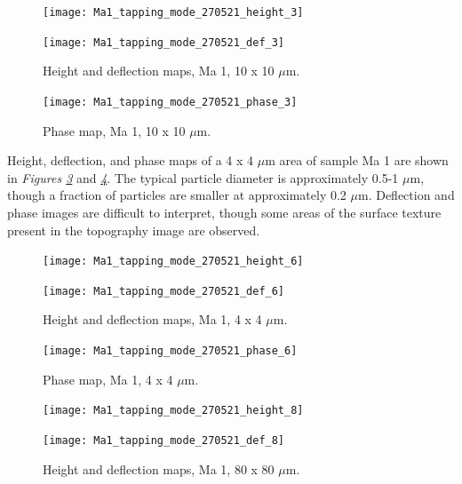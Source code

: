 \begin{figure}[H]
\centering
\begin{minipage}{.45\textwidth}
  \centering
  \texttt{[image: Ma1\_tapping\_mode\_270521\_height\_3]}
\end{minipage}
\begin{minipage}{.45\textwidth}
  \centering
  \texttt{[image: Ma1\_tapping\_mode\_270521\_def\_3]}
\end{minipage}
\caption[Height and deflection maps, Ma 1]{Height and deflection maps, Ma 1, 10 x 10 $\mu$m.}
\label{fig:afm_ma1_height_def_3}
\end{figure}

\begin{figure}[H]
\centering
  \texttt{[image: Ma1\_tapping\_mode\_270521\_phase\_3]}
\caption[Phase map, Ma 1]{Phase map, Ma 1, 10 x 10 $\mu$m.}
\label{fig:afm_ma1_phase_3}
\end{figure}

Height, deflection, and phase maps of a 4 x 4 $\mu$m area of sample Ma 1 are shown in \textit{Figures \ref{fig:afm_ma1_height_def_4}} and \textit{\ref{fig:afm_ma1_phase_4}}. The typical particle diameter is approximately 0.5-1 $\mu$m, though a fraction of particles are smaller at approximately 0.2 $\mu$m. Deflection and phase images are difficult to interpret, though some areas of the surface texture present in the topography image are observed.

\begin{figure}[H]
\centering
\begin{minipage}{.45\textwidth}
  \centering
  \texttt{[image: Ma1\_tapping\_mode\_270521\_height\_6]}
\end{minipage}
\begin{minipage}{.45\textwidth}
  \centering
  \texttt{[image: Ma1\_tapping\_mode\_270521\_def\_6]}
\end{minipage}
\caption[Height and deflection maps, Ma 1]{Height and deflection maps, Ma 1, 4 x 4 $\mu$m.}
\label{fig:afm_ma1_height_def_4}
\end{figure}

\begin{figure}[H]
\centering
  \texttt{[image: Ma1\_tapping\_mode\_270521\_phase\_6]}
\caption[Phase map, Ma 1]{Phase map, Ma 1, 4 x 4 $\mu$m.}
\label{fig:afm_ma1_phase_4}
\end{figure}


\begin{figure}[H]
\centering
\begin{minipage}{.45\textwidth}
  \centering
  \texttt{[image: Ma1\_tapping\_mode\_270521\_height\_8]}
\end{minipage}
\begin{minipage}{.45\textwidth}
  \centering
  \texttt{[image: Ma1\_tapping\_mode\_270521\_def\_8]}
\end{minipage}
\caption[Height and deflection maps, Ma 1]{Height and deflection maps, Ma 1, 80 x 80 $\mu$m.}
\label{fig:afm_ma1_height_def_5}
\end{figure}

